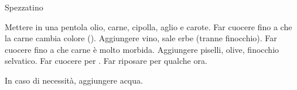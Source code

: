 \begin{recipe}{Spezzatino}
    \begin{header}
    
    \end{header}
    
    \begin{ingredients}
    \end{ingredients}
    
    \begin{preparation}
        \step Mettere in una pentola olio, carne, cipolla, aglio e carote.
        \step Far cuocere fino a che la carne cambia colore ().
        \step Aggiungere vino, sale erbe (tranne finocchio).
        \step Far cuocere fino a che carne è molto morbida.
        \step Aggiungere piselli, olive, finocchio selvatico.
        \step Far cuocere per .
        \step Far riposare per qualche ora.
    \end{preparation}
    
    \begin{suggestion}
        \suggestionMark In caso di necessità, aggiungere acqua.
    \end{suggestion}
    
\end{recipe}
